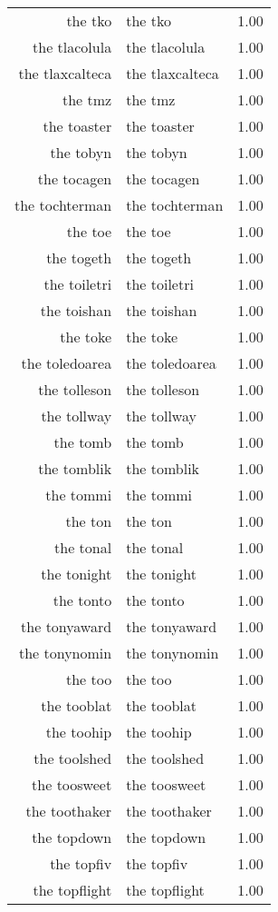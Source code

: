 \begin{table}[ht]
\begin{tabular}{rlr}
  the tko & the tko & 1.00 \\ 
  the tlacolula & the tlacolula & 1.00 \\ 
  the tlaxcalteca & the tlaxcalteca & 1.00 \\ 
  the tmz & the tmz & 1.00 \\ 
  the toaster & the toaster & 1.00 \\ 
  the tobyn & the tobyn & 1.00 \\ 
  the tocagen & the tocagen & 1.00 \\ 
  the tochterman & the tochterman & 1.00 \\ 
  the toe & the toe & 1.00 \\ 
  the togeth & the togeth & 1.00 \\ 
  the toiletri & the toiletri & 1.00 \\ 
  the toishan & the toishan & 1.00 \\ 
  the toke & the toke & 1.00 \\ 
  the toledoarea & the toledoarea & 1.00 \\ 
  the tolleson & the tolleson & 1.00 \\ 
  the tollway & the tollway & 1.00 \\ 
  the tomb & the tomb & 1.00 \\ 
  the tomblik & the tomblik & 1.00 \\ 
  the tommi & the tommi & 1.00 \\ 
  the ton & the ton & 1.00 \\ 
  the tonal & the tonal & 1.00 \\ 
  the tonight & the tonight & 1.00 \\ 
  the tonto & the tonto & 1.00 \\ 
  the tonyaward & the tonyaward & 1.00 \\ 
  the tonynomin & the tonynomin & 1.00 \\ 
  the too & the too & 1.00 \\ 
  the tooblat & the tooblat & 1.00 \\ 
  the toohip & the toohip & 1.00 \\ 
  the toolshed & the toolshed & 1.00 \\ 
  the toosweet & the toosweet & 1.00 \\ 
  the toothaker & the toothaker & 1.00 \\ 
  the topdown & the topdown & 1.00 \\ 
  the topfiv & the topfiv & 1.00 \\ 
  the topflight & the topflight & 1.00 \\ 

\end{tabular}
\end{table}
